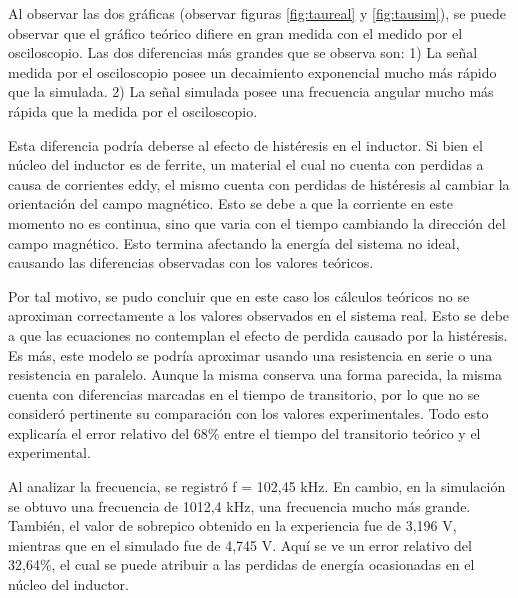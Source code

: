 \documentclass{article}
\begin{document}
   
  Al observar las dos gráficas (observar figuras \ref{fig:taureal} y \ref{fig:tausim}), se puede observar que el gráfico teórico difiere en gran medida con el medido por el osciloscopio. Las dos diferencias más grandes que se observa son: 1) La señal medida por el osciloscopio posee un decaimiento exponencial mucho más rápido que la simulada. 2) La señal simulada posee una frecuencia angular mucho más rápida que la medida por el osciloscopio. \par 
  Esta diferencia podría deberse al efecto de histéresis en el inductor. Si bien el núcleo del inductor es de ferrite, un material el cual no cuenta con perdidas a causa de corrientes eddy, el mismo cuenta con perdidas de histéresis al cambiar la orientación del campo magnético. Esto se debe a que la corriente en este momento no es continua, sino que varia con el tiempo cambiando la dirección del campo magnético. Esto termina afectando la energía del sistema no ideal, causando las diferencias observadas con los valores teóricos.\par
  Por tal motivo, se pudo concluir que en este caso los cálculos teóricos no se aproximan correctamente a los valores observados en el sistema real. Esto se debe a que las ecuaciones no contemplan el efecto de perdida causado por la histéresis. Es más, este modelo se podría aproximar usando una resistencia en serie o una resistencia en paralelo. Aunque la misma conserva una forma parecida, la misma cuenta con diferencias marcadas en el tiempo de transitorio, por lo que no se consideró pertinente su comparación con los valores experimentales. Todo esto explicaría el error relativo del 68\% entre el tiempo del transitorio teórico y el experimental.\par
  Al analizar la frecuencia, se registró f = 102,45 kHz. En cambio, en la simulación se obtuvo una frecuencia de 1012,4 kHz, una frecuencia mucho más grande. También, el valor de sobrepico obtenido en la experiencia fue de 3,196 V, mientras que en el simulado fue de 4,745 V. Aquí se ve un error relativo del 32,64\%, el cual se puede atribuir a las perdidas de energía ocasionadas en el núcleo del inductor.
  
\end{document}
